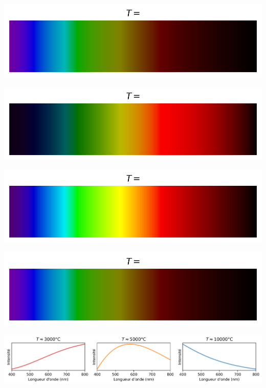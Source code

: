 \documentclass[12pt,a4paper,fleqn]{article}
\begin{document}
\begin{landscape}
\begin{center}
\begin{multicols}{3}
\includegraphics[width=\linewidth]{images/spectrum_black_body_temp10000K_notemp.png}
\end{multicols}
\end{center}

\begin{center}
\begin{multicols}{3}
\includegraphics[width=\linewidth]{images/spectrum_black_body_temp3000K_notemp.png}

\includegraphics[width=\linewidth]{images/spectrum_black_body_temp5000K_notemp.png}

\includegraphics[width=\linewidth]{images/spectrum_black_body_temp10000K_notemp.png}
\end{multicols}
\end{center}

\newpage

\begin{center}
\includegraphics[width=\linewidth]{images/spectrum_black_body_curve10000K.png}
\end{center}


\end{landscape}
\end{document}

